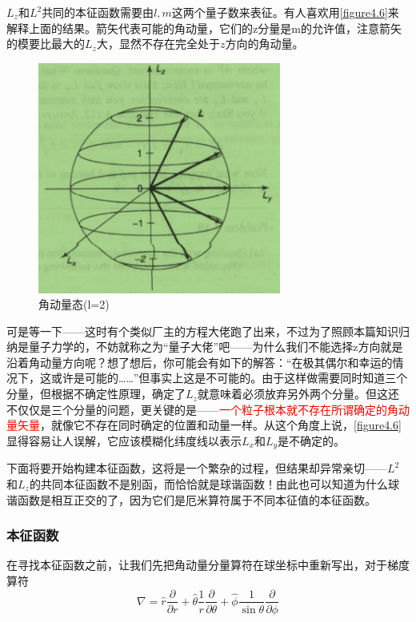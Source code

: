 \documentclass[UTF8]{ctexart}
\newcommand{\red}{\textcolor{red}}
\begin{document}
    $L_z$和$L^2$共同的本征函数需要由$l,m$这两个量子数来表征。有人喜欢用\autoref{figure4.6}来解释上面的结果。箭矢代表可能的角动量，它们的z分量是m的允许值，注意箭矢的模要比最大的$L_z$大，显然不存在完全处于$z$方向的角动量。
    \begin{figure}[H]
        \centering
        \includegraphics[width=8cm]{figure4-6.png}
        \caption{角动量态(l=2)}
        \label{figure4.6}
    \end{figure}

\noindent 可是等一下——这时有个类似厂主的方程大佬跑了出来，不过为了照顾本篇知识归纳是量子力学的，不妨就称之为“量子大佬”吧——为什么我们不能选择z方向就是沿着角动量方向呢？想了想后，你可能会有如下的解答：“在极其偶尔和幸运的情况下，这或许是可能的……”但事实上这是不可能的。由于这样做需要同时知道三个分量，但根据不确定性原理，确定了$L_z$就意味着必须放弃另外两个分量。但这还不仅仅是三个分量的问题，更关键的是——\red{一个粒子根本就不存在所谓确定的角动量矢量}，就像它不存在同时确定的位置和动量一样。从这个角度上说，\autoref{figure4.6}显得容易让人误解，它应该模糊化纬度线以表示$L_x$和$L_y$是不确定的。

    下面将要开始构建本征函数，这将是一个繁杂的过程，但结果却异常亲切——$L^2$和$L_z$的共同本征函数不是别函，而恰恰就是球谐函数！由此也可以知道为什么球谐函数是相互正交的了，因为它们是厄米算符属于不同本征值的本征函数。

    \subsubsection{本征函数}
    在寻找本征函数之前，让我们先把角动量分量算符在球坐标中重新写出，对于梯度算符
    \begin{equation}
        \nabla = \hat{r} \frac{\partial}{\partial r} + \hat{\theta} \frac{1}{r} \frac{\partial}{\partial \theta} + \hat{\phi} \frac{1}{\sin \theta} \frac{\partial}{\partial \phi}
    \end{equation}
    
\end{document}
